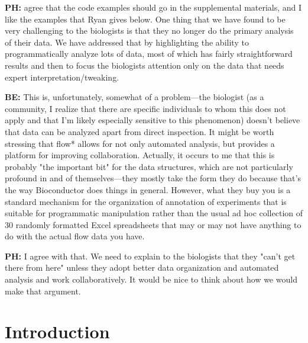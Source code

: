 \documentclass[12pt]{article}
\begin{document}
{\bf PH:} agree that the code examples should go in the supplemental
materials, and I like the examples that Ryan gives below. One thing
that we have found to be very challenging to the biologists is that
they no longer do the primary analysis of their data. We have
addressed that by highlighting the ability to programmatically analyze
lots of data, most of which has fairly straightforward results and
then to focus the biologists attention only on the data that needs
expert interpretation/tweaking.

{\bf BE:} This is, unfortunately, somewhat of a problem---the biologist (as
a community, I realize that there are specific individuals to whom
this does not apply and that I'm likely especially sensitive to this
phenomenon) doesn't believe that data can be analyzed apart from
direct inspection. It might be worth stressing that flow* allows for
not only automated analysis, but provides a platform for improving
collaboration. Actually, it occurs to me that this is probably "the
important bit" for the data structures, which are not particularly
profound in and of themselves---they mostly take the form they do
because that's the way Bioconductor does things in general. However,
what they buy you is a standard mechanism for the organization of
annotation of experiments that is suitable for programmatic
manipulation rather than the usual ad hoc collection of 30 randomly
formatted Excel spreadsheets that may or may not have anything to do
with the actual flow data you have.

{\bf PH:} I agree with that. We need to explain to the biologists that they
"can't get there from here" unless they adopt better data organization
and automated analysis and work collaboratively. It would be nice to
think about how we would make that argument.

\bigskip











\maketitle

\section{Introduction}
\end{document}
